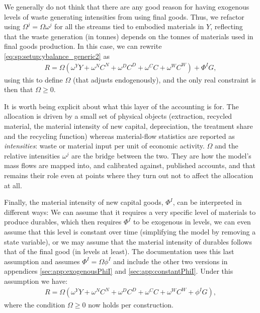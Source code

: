 We generally do not think that there are any good reason for having exogenous levels of waste generating intensities from using final goods. Thus, we refactor using $\Omega^j = \Omega \omega^j$ for all the streams tied to embodied materials in $Y$, reflecting that the waste generation (in tonnes) depends on the tonnes of materials used in final goods production. In this case, we can rewrite \eqref{eq:sp:setup:ybalance_generic2} as
\begin{align}
    R =  \Omega \left(\omega^Y Y + \omega^{N}C^N + \omega^{D}C^D + \omega^C C + \omega^W C^W\right) + \Phi^I G \label{eq:sp:setup:ybalance_Omega},
\end{align}
using this to define $\Omega$ (that adjusts endogenously), and the only real constraint is then that $\Omega\geq0$.

It is worth being explicit about what this layer of the accounting is for. The allocation is driven by a small set of physical objects (extraction, recycled material, the material intensity of new capital, depreciation, the treatment share and the recycling function) whereas material-flow statistics are reported as \emph{intensities}: waste or material input per unit of economic activity. $\Omega$ and the relative intensities $\omega^j$ are the bridge between the two. They are how the model's mass flows are mapped into, and calibrated against, published accounts, and that remains their role even at points where they turn out not to affect the allocation at all.

Finally, the material intensity of new capital goods, $\Phi^I$, can be interpreted in different ways: We can assume that it requires a very specific level of materials to produce durables, which then requires $\Phi^I$ to be exogenous in levels, we can even assume that this level is constant over time (simplifying the model by removing a state variable), or we may assume that the material intensity of durables follows that of the final good (in levels at least). The documentation uses this last assumption and assumes $\Phi^I = \Omega \phi^I$ and include the other two versions in appendices \ref{sec:app:exogenousPhiI} and \ref{sec:app:constantPhiI}. Under this assumption we have:
\begin{align}
    R =  \Omega \left(\omega^Y Y + \omega^{N}C^N + \omega^{D}C^D + \omega^C C + \omega^W C^W+\phi^I G\right) \label{eq:sp:setup:ybalance_OmegaPhi},
\end{align}
where the condition $\Omega\geq0$ now holds per construction.

